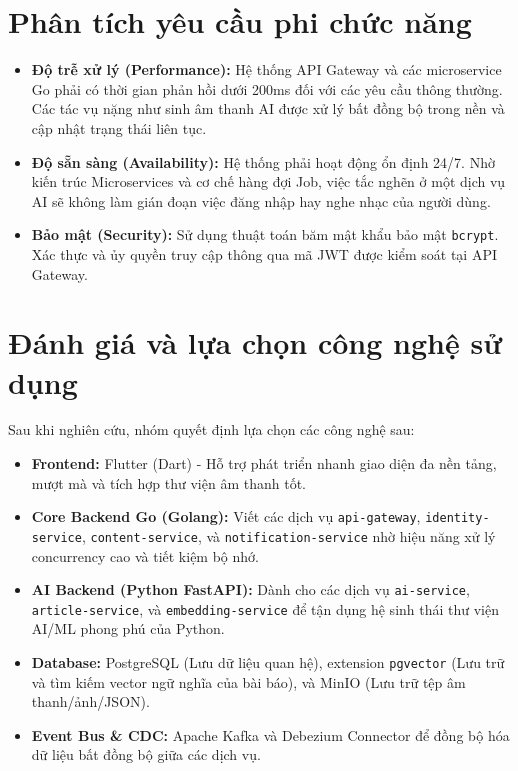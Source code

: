 \documentclass[12pt,a4paper]{report}
\begin{document}
\section{Phân tích yêu cầu phi chức năng}
\begin{itemize}
    \item \textbf{Độ trễ xử lý (Performance):} Hệ thống API Gateway và các microservice Go phải có thời gian phản hồi dưới 200ms đối với các yêu cầu thông thường. Các tác vụ nặng như sinh âm thanh AI được xử lý bất đồng bộ trong nền và cập nhật trạng thái liên tục.
    \item \textbf{Độ sẵn sàng (Availability):} Hệ thống phải hoạt động ổn định 24/7. Nhờ kiến trúc Microservices và cơ chế hàng đợi Job, việc tắc nghẽn ở một dịch vụ AI sẽ không làm gián đoạn việc đăng nhập hay nghe nhạc của người dùng.
    \item \textbf{Bảo mật (Security):} Sử dụng thuật toán băm mật khẩu bảo mật \texttt{bcrypt}. Xác thực và ủy quyền truy cập thông qua mã JWT được kiểm soát tại API Gateway.
\end{itemize}

\section{Đánh giá và lựa chọn công nghệ sử dụng}
Sau khi nghiên cứu, nhóm quyết định lựa chọn các công nghệ sau:
\begin{itemize}
    \item \textbf{Frontend:} Flutter (Dart) - Hỗ trợ phát triển nhanh giao diện đa nền tảng, mượt mà và tích hợp thư viện âm thanh tốt.
    \item \textbf{Core Backend Go (Golang):} Viết các dịch vụ \texttt{api-gateway}, \texttt{identity-service}, \texttt{content-service}, và \texttt{notification-service} nhờ hiệu năng xử lý concurrency cao và tiết kiệm bộ nhớ.
    \item \textbf{AI Backend (Python FastAPI):} Dành cho các dịch vụ \texttt{ai-service}, \texttt{article-service}, và \texttt{embedding-service} để tận dụng hệ sinh thái thư viện AI/ML phong phú của Python.
    \item \textbf{Database:} PostgreSQL (Lưu dữ liệu quan hệ), extension \texttt{pgvector} (Lưu trữ và tìm kiếm vector ngữ nghĩa của bài báo), và MinIO (Lưu trữ tệp âm thanh/ảnh/JSON).
    \item \textbf{Event Bus \& CDC:} Apache Kafka và Debezium Connector để đồng bộ hóa dữ liệu bất đồng bộ giữa các dịch vụ.
\end{itemize}
\end{document}
